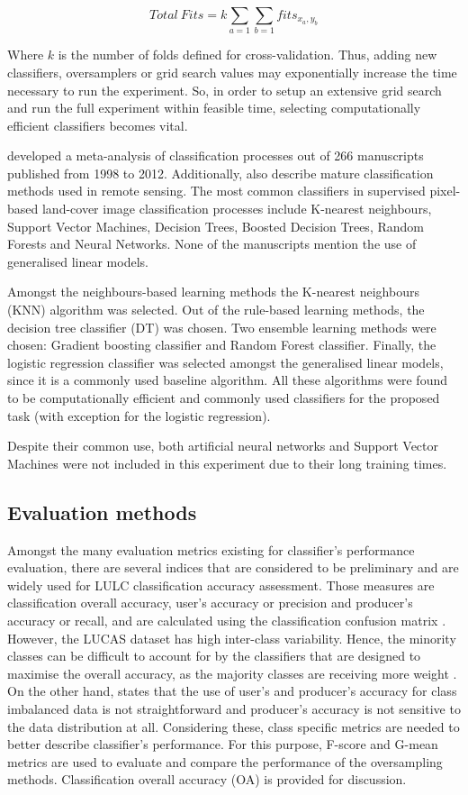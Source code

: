 \documentclass[parskip=full]{scrartcl}
\begin{document}
\[
Total\ Fits=k\sum\limits_{a=1} \sum\limits_{b=1} fits_{x_a,y_b}
\]

Where $k$ is the number of folds defined for cross-validation. Thus, adding new
classifiers, oversamplers or grid search values may exponentially increase the
time necessary to run the experiment. So, in order to setup an extensive grid
search and run the full experiment within feasible time, selecting
computationally efficient classifiers becomes vital.

\cite{Khatami2016} developed a meta-analysis of classification processes out
of 266 manuscripts published from 1998 to 2012. Additionally,
\cite{Maxwell2018} also describe mature classification methods used in remote
sensing. The most common classifiers in supervised pixel-based land-cover image
classification processes include K-nearest neighbours, Support Vector Machines,
Decision Trees, Boosted Decision Trees, Random Forests and Neural Networks.
None of the manuscripts mention the use of generalised linear models.

Amongst the neighbours-based learning methods the K-nearest neighbours (KNN)
algorithm was selected. Out of the rule-based learning methods, the decision
tree classifier (DT) was chosen. Two ensemble learning methods were chosen:
Gradient boosting classifier and Random Forest classifier. Finally, the
logistic regression classifier was selected amongst the generalised linear
models, since it is a commonly used baseline algorithm. All these algorithms
were found to be computationally efficient and commonly used classifiers for
the proposed task (with exception for the logistic regression).

Despite their common use, both artificial neural networks and Support
Vector Machines were not included in this experiment due to their long training
times.

\subsection{Evaluation methods}

Amongst the many evaluation metrics existing for classifier's performance
evaluation, there are several indices that are considered to be preliminary and
are widely used for LULC classification accuracy assessment. Those measures are
classification overall accuracy, user's accuracy or precision and
producer's accuracy or recall,  and are calculated using the classification
confusion matrix \cite{Liu2007}. However, the LUCAS dataset has high
inter-class variability. Hence, the minority classes can be difficult to
account for by the classifiers that are designed to maximise the overall
accuracy, as the majority classes are receiving more weight \cite{Inglada2017}.
On the other hand, \cite{He2008} states that the use of user's and producer's
accuracy for class imbalanced data is not straightforward and producer's
accuracy is not sensitive to the data distribution at all. Considering these,
class specific metrics are needed to better describe classifier's performance. 
For this purpose, F-score and G-mean metrics are used to evaluate and compare 
the performance of the oversampling methods. Classification overall accuracy 
(OA) is provided for discussion.
\end{document}
